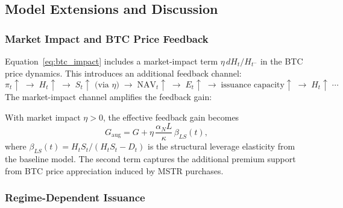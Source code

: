 \subsection{Model Extensions and Discussion}
\label{sec:extensions}

\subsubsection{Market Impact and BTC Price Feedback}
\label{sec:market_impact_ext}

Equation~\eqref{eq:btc_impact} includes a market-impact term
$\eta\,dH_t/H_{t^-}$ in the BTC price dynamics.  This introduces an
additional feedback channel:
\begin{equation}
  \label{eq:full_feedback}
  \pi_t \uparrow \;\to\;
  H_t \uparrow \;\to\;
  S_t \uparrow \text{ (via $\eta$)} \;\to\;
  \mathrm{NAV}_t \uparrow \;\to\;
  E_t \uparrow \;\to\;
  \text{issuance capacity} \uparrow \;\to\;
  H_t \uparrow\;\cdots
\end{equation}
The market-impact channel amplifies the feedback gain:

\begin{proposition}
  \label{prop:augmented_gain}
  With market impact $\eta > 0$, the effective feedback gain becomes
  \begin{equation}
    \label{eq:augmented_gain}
    G_{\mathrm{aug}} = G + \eta\,\frac{\alpha_N L}{\kappa}\,\beta_{LS}(t),
  \end{equation}
  where $\beta_{LS}(t) = H_t S_t / (H_t S_t - D_t)$ is the structural
  leverage elasticity from the baseline model.  The second term captures the
  additional premium support from BTC price appreciation induced by MSTR
  purchases.
\end{proposition}

\subsubsection{Regime-Dependent Issuance}
\label{sec:regime_issuance}

